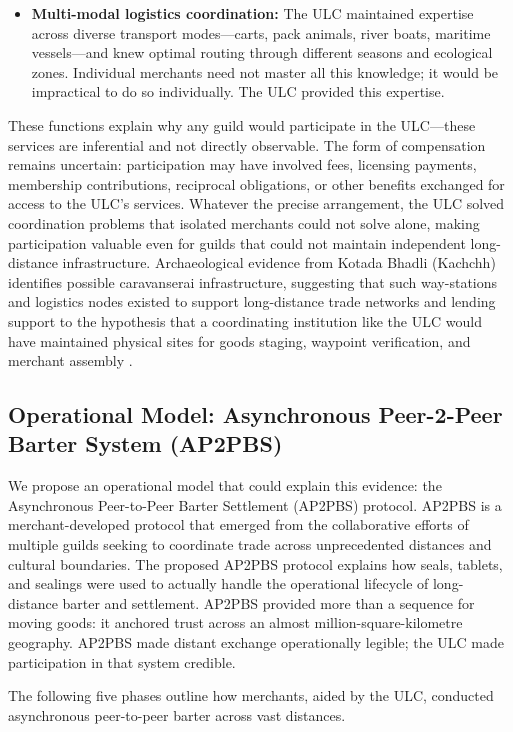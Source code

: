 \documentclass[12pt]{article}
\begin{document}
\begin{itemize}
\item \textbf{Multi-modal logistics coordination:} The ULC maintained expertise across
diverse transport modes---carts, pack animals, river boats, maritime vessels---and knew
optimal routing through different seasons and ecological zones. Individual merchants
need not master all this knowledge; it would be impractical to do so individually.
The ULC provided this expertise.
\end{itemize}

These functions explain why any guild would participate in the ULC---these services
are inferential and not directly observable. The form of compensation remains
uncertain: participation may have involved fees, licensing payments, membership
contributions, reciprocal obligations, or other benefits exchanged for access to
the ULC's services. Whatever the precise arrangement, the ULC solved coordination
problems that isolated merchants could not solve alone, making participation valuable
even for guilds that could not maintain independent long-distance infrastructure.
Archaeological evidence from Kotada Bhadli (Kachchh) identifies possible
caravanserai infrastructure, suggesting that such way-stations and logistics nodes
existed to support long-distance trade networks and lending support to the hypothesis
that a coordinating institution like the ULC would have maintained physical sites
for goods staging, waypoint verification, and merchant assembly
\citep{shirvalkar2025caravanserai}.

\subsection{Operational Model: Asynchronous Peer-2-Peer Barter System (AP2PBS)}

We propose an operational model that could explain this evidence: the
Asynchronous Peer-to-Peer Barter Settlement (AP2PBS) protocol. AP2PBS is a
merchant-developed protocol that emerged from the collaborative efforts of multiple
guilds seeking to coordinate trade across unprecedented distances and cultural
boundaries. The proposed AP2PBS protocol explains how seals, tablets,
and sealings were used to actually handle the operational lifecycle of long-distance
barter and settlement.  AP2PBS provided more than a sequence for moving goods: it
anchored trust across an almost million-square-kilometre geography.  AP2PBS made
distant exchange operationally legible; the ULC made participation in that system
credible.

The following five phases outline how merchants, aided by the ULC, conducted
asynchronous peer-to-peer barter across vast distances.
\end{document}

